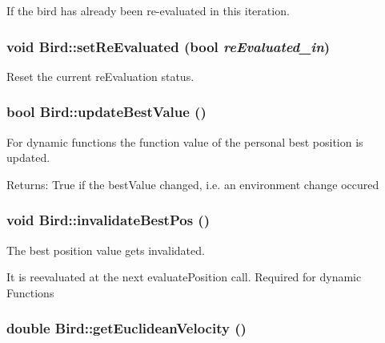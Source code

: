 If the bird has already been re-evaluated in this iteration. 

\hypertarget{classBird_f315e6e1f1b2eebf58f57e774e899a8f}{
\subsubsection{\setlength{\rightskip}{0pt plus 5cm}void Bird::setReEvaluated (bool {\em reEvaluated\_\-in})}}
\label{classBird_f315e6e1f1b2eebf58f57e774e899a8f}


Reset the current reEvaluation status. 

\hypertarget{classBird_d727d4ff5f291fa2098dbc9f609ed05b}{
\subsubsection{\setlength{\rightskip}{0pt plus 5cm}bool Bird::updateBestValue ()}}
\label{classBird_d727d4ff5f291fa2098dbc9f609ed05b}


For dynamic functions the function value of the personal best position is updated. 

\begin{Desc}
\item[Returns:]True if the bestValue changed, i.e. an environment change occured \end{Desc}
\hypertarget{classBird_3840ba9575ad5266bb00b2b0eba49fff}{
\subsubsection{\setlength{\rightskip}{0pt plus 5cm}void Bird::invalidateBestPos ()}}
\label{classBird_3840ba9575ad5266bb00b2b0eba49fff}


The best position value gets invalidated. 

It is reevaluated at the next evaluatePosition call. Required for dynamic Functions \hypertarget{classBird_0f8704555e859618ae188841f2ab0efe}{
\subsubsection{\setlength{\rightskip}{0pt plus 5cm}double Bird::getEuclideanVelocity ()}}
\label{classBird_0f8704555e859618ae188841f2ab0efe}


